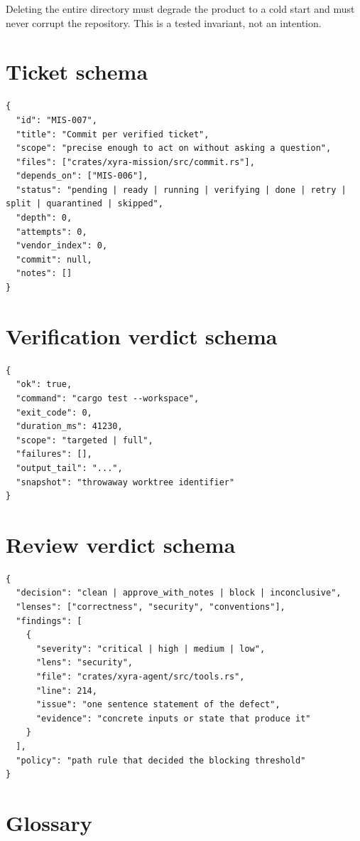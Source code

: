 Deleting the entire directory must degrade the product to a cold start and must never
corrupt the repository. This is a tested invariant, not an intention.

\section{Ticket schema}

\begin{lstlisting}
{
  "id": "MIS-007",
  "title": "Commit per verified ticket",
  "scope": "precise enough to act on without asking a question",
  "files": ["crates/xyra-mission/src/commit.rs"],
  "depends_on": ["MIS-006"],
  "status": "pending | ready | running | verifying | done | retry | split | quarantined | skipped",
  "depth": 0,
  "attempts": 0,
  "vendor_index": 0,
  "commit": null,
  "notes": []
}
\end{lstlisting}

\section{Verification verdict schema}

\begin{lstlisting}
{
  "ok": true,
  "command": "cargo test --workspace",
  "exit_code": 0,
  "duration_ms": 41230,
  "scope": "targeted | full",
  "failures": [],
  "output_tail": "...",
  "snapshot": "throwaway worktree identifier"
}
\end{lstlisting}

\section{Review verdict schema}

\begin{lstlisting}
{
  "decision": "clean | approve_with_notes | block | inconclusive",
  "lenses": ["correctness", "security", "conventions"],
  "findings": [
    {
      "severity": "critical | high | medium | low",
      "lens": "security",
      "file": "crates/xyra-agent/src/tools.rs",
      "line": 214,
      "issue": "one sentence statement of the defect",
      "evidence": "concrete inputs or state that produce it"
    }
  ],
  "policy": "path rule that decided the blocking threshold"
}
\end{lstlisting}

\section{Glossary}

